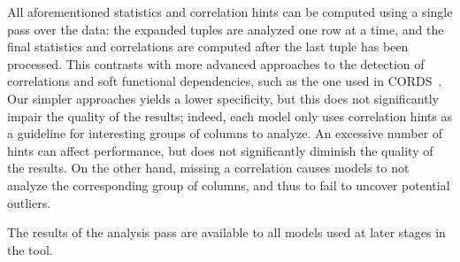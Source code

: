 All aforementioned statistics and correlation hints can be computed using a single pass over the data: the expanded tuples are analyzed one row at a time, and the final statistics and correlations are computed after the last tuple has been processed. This contrasts with more advanced approaches to the detection of correlations and soft functional dependencies, such as the one used in CORDS~\cite{Ilyas2004}. Our simpler approaches yields a lower specificity, but this does not significantly impair the quality of the results; indeed, each model only uses correlation hints as a guideline for interesting groups of columns to analyze. An excessive number of hints can affect performance, but does not significantly diminish the quality of the results. On the other hand, missing a correlation causes models to not analyze the corresponding group of columns, and thus to fail to uncover potential outliers.

The results of the analysis pass are available to all models used at later stages in the tool.
